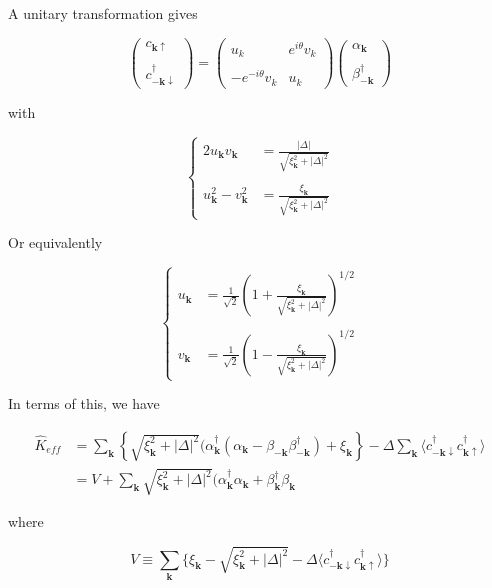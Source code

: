 A unitary transformation gives

\[
\left(\begin{matrix}
c_{\bm{k}\uparrow}\\
\ \\
c_{-\bm{k}\downarrow}^\dagger
\end{matrix}\right) 
= \left(\begin{matrix}
u_k & e^{i\theta}v_k\\
\ & \ \\
-e^{-i\theta}v_k & u_k
\end{matrix}\right) \left(\begin{matrix}
\alpha_{\bm{k}}\\
\ \\
\beta_{-\bm{k}}^\dagger
\end{matrix}\right)  \]

with

\[
\begin{cases}
2u_{\bm{k}}v_{\bm{k}} &= \displaystyle\frac{|\Delta|}{\sqrt{\xi_{\bm{k}}^2+|\Delta|^2}}\\
\ & \ \\
u_{\bm{k}}^2-v_{\bm{k}}^2 &= \displaystyle\frac{\xi_{\bm{k}}}{\sqrt{\xi_{\bm{k}}^2+|\Delta|^2}}
\end{cases}\]

Or equivalently

\[
\begin{cases}
u_{\bm{k}} &= \displaystyle\frac{1}{\sqrt{2}}\left(1+\frac{\xi_{\bm{k}}}{\sqrt{\xi_{\bm{k}}^2+|\Delta|^2}}\right)^{1/2}\\
\ & \ \\
v_{\bm{k}} &= \displaystyle\frac{1}{\sqrt{2}}\left(1-\frac{\xi_{\bm{k}}}{\sqrt{\xi_{\bm{k}}^2+|\Delta|^2}}\right)^{1/2}
\end{cases}
\]

In terms of this, we have

\[\begin{split}
\hat{K}_{eff}&=\sum_{\bm{k}}\left\{\sqrt{\xi_{\bm{k}}^2+|\Delta|^2}(\alpha_{\bm{k}}^\dagger(\alpha_{\bm{k}}-\beta_{-\bm{k}}\beta_{-\bm{k}}^\dagger)+\xi_{\bm{k}}\right\}- \Delta\sum_{\bm{k}}\langle c_{-\bm{k}\downarrow}^\dagger c_{\bm{k}\uparrow}^\dagger\rangle\\
&= V+\sum_{\bm{k}}\sqrt{\xi_{\bm{k}}^2+|\Delta|^2}(\alpha_{\bm{k}}^\dagger\alpha_{\bm{k}}+\beta_{\bm{k}}^\dagger\beta_{\bm{k}}
\end{split}\]

where

\[V \equiv\sum_{\bm{k}}\{\xi_{\bm{k}}-\sqrt{\xi_{\bm{k}}^2+|\Delta|^2}-\Delta\langle c_{-\bm{k}\downarrow}^\dagger c_{\bm{k}\uparrow}^\dagger\rangle\} \]


